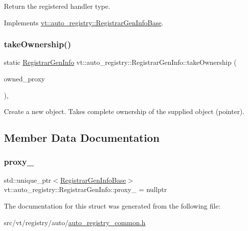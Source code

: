 Return the registered handler type. 



Implements \hyperlink{structvt_1_1auto__registry_1_1_registrar_gen_info_base_ac498c953bb4a951399d66272cae76b05}{vt\+::auto\+\_\+registry\+::\+Registrar\+Gen\+Info\+Base}.

\mbox{\label{structvt_1_1auto__registry_1_1_registrar_gen_info_a5d200e841fd5ac4bd1aee02d67f77c15}} 
\subsubsection{\texorpdfstring{take\+Ownership()}{takeOwnership()}}
{\footnotesize\ttfamily static \hyperlink{structvt_1_1auto__registry_1_1_registrar_gen_info}{Registrar\+Gen\+Info} vt\+::auto\+\_\+registry\+::\+Registrar\+Gen\+Info\+::take\+Ownership (\begin{DoxyParamCaption}\item[{\hyperlink{structvt_1_1auto__registry_1_1_registrar_gen_info_base}{Registrar\+Gen\+Info\+Base} $\ast$}]{owned\+\_\+proxy }\end{DoxyParamCaption})\hspace{0.3cm}{\ttfamily [inline]}, {\ttfamily [static]}}

Create a new object. Takes complete ownership of the supplied object (pointer). 

\subsection{Member Data Documentation}
\mbox{\label{structvt_1_1auto__registry_1_1_registrar_gen_info_a7f3d40cb988a3d3b56f9cbd5f910d14c}} 
\subsubsection{\texorpdfstring{proxy\+\_\+}{proxy\_}}
{\footnotesize\ttfamily std\+::unique\+\_\+ptr$<$\hyperlink{structvt_1_1auto__registry_1_1_registrar_gen_info_base}{Registrar\+Gen\+Info\+Base}$>$ vt\+::auto\+\_\+registry\+::\+Registrar\+Gen\+Info\+::proxy\+\_\+ = nullptr\hspace{0.3cm}{\ttfamily [private]}}



The documentation for this struct was generated from the following file\+:\begin{DoxyCompactItemize}
\item 
src/vt/registry/auto/\hyperlink{auto__registry__common_8h}{auto\+\_\+registry\+\_\+common.\+h}\end{DoxyCompactItemize}
